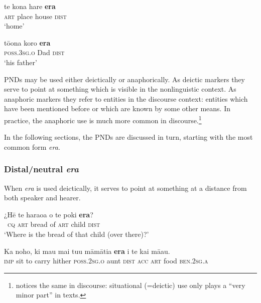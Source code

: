 \ea\label{ex:4.195}
\gll te kona hare \textbf{era} \\
\textsc{art} place house \textsc{dist} \\

\glt 
‘home’ \textstyleExampleref{[R210.021]} 
\z

\ea\label{ex:4.196}
\gll tō{\ꞌ}ona koro \textbf{era} \\
\textsc{poss.3sg.o} Dad \textsc{dist} \\

\glt
‘his father’ \textstyleExampleref{[R380.010]} 
\z

PNDs may be used either deictically or anaphorically. As deictic markers they serve to point at something which is visible in the nonlinguistic context. As anaphoric markers they refer to entities in the discourse context: entities which have been mentioned before or which are known by some other means. In practice, the anaphoric use is much more common in discourse.\footnote{\label{fn:216}\citet[363]{Hooper2010} notices the same in  discourse: situational (=deictic) use only plays a “very minor part” in texts.}

In the following sections, the PNDs are discussed in turn, starting with the most common form \textit{era}.

\subsubsection[Distal/neutral era]{Distal/neutral \textit{era}}\label{sec:4.6.3.1}

When \textit{era} is used deictically, it serves to point at something at a distance from both speaker and hearer. 

\ea\label{ex:4.197}
\gll ¿Hē te haraoa o te poki \textbf{era}?\\
~\textsc{cq} \textsc{art} bread of \textsc{art} child \textsc{dist}\\

\glt 
‘Where is the bread of that child (over there)?’ \textstyleExampleref{[R245.041]} 
\z

\ea\label{ex:4.198}
\gll Ka noho, ki ma{\ꞌ}u mai tu{\ꞌ}u māmātia \textbf{era} i te kai mā{\ꞌ}au.\\
\textsc{imp} sit to carry hither \textsc{poss.2sg.o} aunt \textsc{dist} \textsc{acc} \textsc{art} food \textsc{ben.2sg.a}\\

